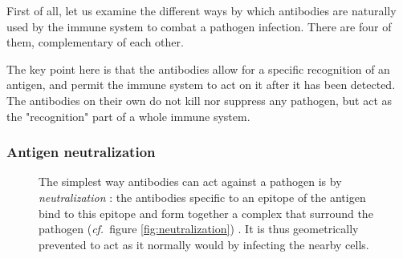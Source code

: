 First of all, let us examine the different ways by which
antibodies are naturally used by the immune system to combat
a pathogen infection. There are four of them, complementary of each other.

The key point here is that the antibodies allow for a specific recognition
of an antigen, and permit the immune system to act on it after it has
been detected. The antibodies on their own do not kill nor suppress any pathogen,
but act as the "recognition" part of a whole immune system.

\subsubsection{Antigen neutralization}

\begin{figure}[H]
    \begin{minipage}{0.55\textwidth}
        The simplest way antibodies can act against a pathogen is by
        \emph{neutralization} : the antibodies specific to an epitope of the
        antigen bind to this epitope and form together a complex that surround
        the pathogen (\textit{cf.}~figure \ref{fig:neutralization}) \cite{langermans_antimicrobial_1994}.
        It is thus geometrically prevented to act as it normally would 
        by infecting the nearby cells.


\end{minipage}
\end{figure}
